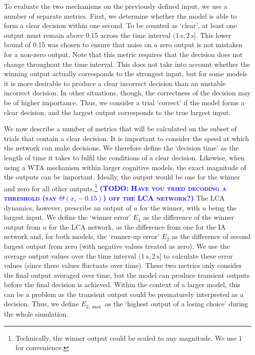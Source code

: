 \documentclass[10pt,letterpaper]{article}
\makeatletter
\newcommand{\todo}[1]{\textbf{\textsc{\textcolor{blue}{(TODO\@: #1)}}}}
\makeatother
\begin{document}
To evaluate the two mechanisms on the previously defined input, we use a number of separate metrics.
First, we determine whether the model is able to form a clear decision within one second.
To be counted as `clear', at least one output must remain above 0.15 across the time interval $(\SI{1}{\second}, \SI{2}{\second}]$. %
This lower bound of 0.15 was chosen to ensure that noise on a zero output is not mistaken for a non-zero output.
Note that this metric requires that the decision does not change throughout the time interval.
This does not take into account whether the winning output actually corresponds to the strongest input, but for some models it is more desirable to produce a clear incorrect decision than an unstable incorrect decision.
In other situations, though, the correctness of the decision may be of higher importance.
Thus, we consider a trial `correct' if the model forms a clear decision, and the largest output corresponds to the true largest input.

We now describe a number of metrics that will be calculated on the subset of trials that contain a clear decision.
It is important to consider the speed at which the network can make decisions.
We therefore define the `decision time' as the length of time it takes to fulfil the conditions of a clear decision.
Likewise, when using a WTA mechanism within larger cognitive models, the exact magnitude of the outputs can be important.
Ideally, the output would be one for the winner and zero for all other outputs.\footnote{Technically, the winner output could be scaled to any magnitude.
We use $1$ for convenience.}
\todo{Have you tried decoding a threshold (say $\Theta(x_i - 0.15)$) off the LCA network?}
The LCA dynamics, however, prescribe an output of $u$ for the winner, with $u$ being the largest input.
We define the `winner error' $E_1$ as the difference of the winner output from $u$ for the LCA network, as the difference from one for the IA network and, for both models, the `runner-up error' $E_2$ as the difference of second largest output from zero (with negative values treated as zero).
We use the average output values over the time interval $(\SI{1}{\second}, \SI{2}{\second}]$ to calculate these error values (since these values fluctuate over time).
These two metrics only consider the final output averaged over time, but the model can produce transient outputs before the final decision is achieved.
Within the context of a larger model, this can be a problem as the transient output could be prematurely interpreted as a decision.
Thus, we define $E_{2,\max}$ as the `highest output of a losing choice' during the whole simulation.
\end{document}
